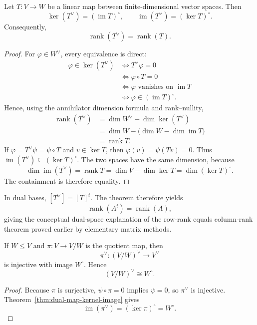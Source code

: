 \begin{theorem}\label{thm:dual-map-kernel-image}
Let \(T:V\to W\) be a linear map between finite-dimensional vector spaces.
Then
\[
\ker(T^\vee)=(\operatorname{im}T)^\circ,
\qquad
\operatorname{im}(T^\vee)=(\ker T)^\circ.
\]
Consequently,
\[
\operatorname{rank}(T^\vee)=\operatorname{rank}(T).
\]
\end{theorem}
\begin{proof}
For \(\varphi\in W^\vee\), every equivalence is direct:
\[
\begin{aligned}
\varphi\in\ker(T^\vee)
&\Longleftrightarrow T^\vee\varphi=0\\
&\Longleftrightarrow \varphi\circ T=0\\
&\Longleftrightarrow \varphi\text{ vanishes on }\operatorname{im}T\\
&\Longleftrightarrow \varphi\in(\operatorname{im}T)^\circ.
\end{aligned}
\]
Hence, using the annihilator dimension formula and rank--nullity,
\[
\begin{aligned}
\operatorname{rank}(T^\vee)
&=\dim W^\vee-\dim\ker(T^\vee)\\
&=\dim W-\bigl(\dim W-\dim\operatorname{im}T\bigr)\\
&=\operatorname{rank}T.
\end{aligned}
\]
If \(\varphi=T^\vee\psi=\psi\circ T\) and \(v\in\ker T\), then
\(\varphi(v)=\psi(Tv)=0\).  Thus
\(\operatorname{im}(T^\vee)\subseteq(\ker T)^\circ\).  The two spaces have
the same dimension, because
\[
\dim\operatorname{im}(T^\vee)=\operatorname{rank}T
=\dim V-\dim\ker T=\dim(\ker T)^\circ.
\]
The containment is therefore equality.
\end{proof}

In dual bases,
\([T^\vee]=[T]^t\).  The theorem therefore yields
\[
\operatorname{rank}(A^t)=\operatorname{rank}(A),
\]
giving the conceptual dual-space explanation of the row-rank equals
column-rank theorem proved earlier by elementary matrix methods.

\begin{proposition}\label{prop:quotient-dual}
If \(W\leq V\) and \(\pi:V\to V/W\) is the quotient map, then
\[
\pi^\vee:(V/W)^\vee\longrightarrow V^\vee
\]
is injective with image \(W^\circ\).  Hence
\[
(V/W)^\vee\cong W^\circ.
\]
\end{proposition}
\begin{proof}
Because \(\pi\) is surjective, \(\psi\circ\pi=0\) implies \(\psi=0\), so
\(\pi^\vee\) is injective.  Theorem~\ref{thm:dual-map-kernel-image} gives
\[
\operatorname{im}(\pi^\vee)=(\ker\pi)^\circ=W^\circ.
\]
\end{proof}

